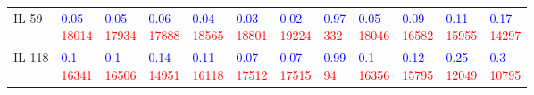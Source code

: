 \begin{tabular}{llllllllllll}
IL 59  &  \makecell{\textcolor{blue}{0.05} \\ \textcolor{red}{18014}} &  \makecell{\textcolor{blue}{0.05} \\ \textcolor{red}{17934}} &  \makecell{\textcolor{blue}{0.06} \\ \textcolor{red}{17888}} &  \makecell{\textcolor{blue}{0.04} \\ \textcolor{red}{18565}} &  \makecell{\textcolor{blue}{0.03} \\ \textcolor{red}{18801}} &  \makecell{\textcolor{blue}{0.02} \\ \textcolor{red}{19224}} &   \makecell{\textcolor{blue}{0.97} \\ \textcolor{red}{332}} &  \makecell{\textcolor{blue}{0.05} \\ \textcolor{red}{18046}} &  \makecell{\textcolor{blue}{0.09} \\ \textcolor{red}{16582}} &  \makecell{\textcolor{blue}{0.11} \\ \textcolor{red}{15955}} &  \makecell{\textcolor{blue}{0.17} \\ \textcolor{red}{14297}} \\
IL 118 &   \makecell{\textcolor{blue}{0.1} \\ \textcolor{red}{16341}} &   \makecell{\textcolor{blue}{0.1} \\ \textcolor{red}{16506}} &  \makecell{\textcolor{blue}{0.14} \\ \textcolor{red}{14951}} &  \makecell{\textcolor{blue}{0.11} \\ \textcolor{red}{16118}} &  \makecell{\textcolor{blue}{0.07} \\ \textcolor{red}{17512}} &  \makecell{\textcolor{blue}{0.07} \\ \textcolor{red}{17515}} &    \makecell{\textcolor{blue}{0.99} \\ \textcolor{red}{94}} &   \makecell{\textcolor{blue}{0.1} \\ \textcolor{red}{16356}} &  \makecell{\textcolor{blue}{0.12} \\ \textcolor{red}{15795}} &  \makecell{\textcolor{blue}{0.25} \\ \textcolor{red}{12049}} &   \makecell{\textcolor{blue}{0.3} \\ \textcolor{red}{10795}} \\

\end{tabular}
